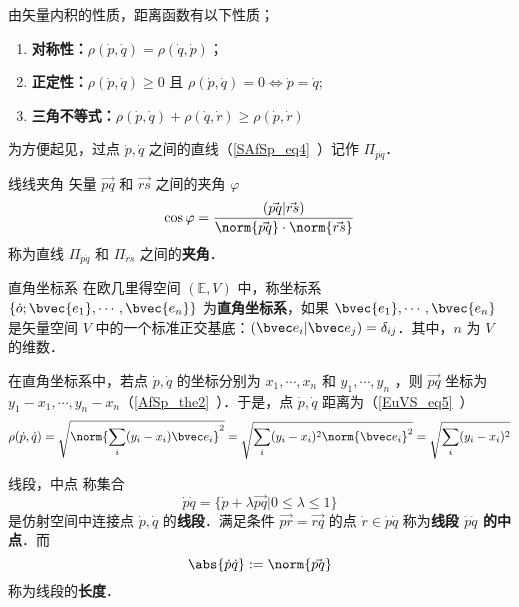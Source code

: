 由矢量内积的性质，距离函数有以下性质；
\begin{enumerate}
\item \textbf{对称性：}$\rho(\dot p,\dot q)=\rho(\dot q,\dot p)$；
\item \textbf{正定性：}$\rho(\dot p,\dot q)\geq 0$ 且 $\rho(\dot p,\dot q)= 0\Leftrightarrow\dot p=\dot q$;
\item \textbf{三角不等式：}$\rho(\dot p,\dot q)+\rho(\dot q,\dot r)\geq\rho(\dot p,\dot r)$
\end{enumerate}
为方便起见，过点 $\dot p,\dot q$ 之间的直线（\autoref{SAfSp_eq4}~）记作 $\Pi_{\dot p\dot q}$．
\begin{definition}{线线夹角}
矢量 $\vec{pq}$ 和 $\vec{rs}$ 之间的夹角 $\varphi$
\begin{equation}
\cos\varphi=\frac{(\vec{pq}|\vec{rs})}{\norm{\vec{pq}}\cdot\norm{\vec{rs}}}
\end{equation}
称为直线 $\Pi_{\dot p\dot q}$ 和 $\Pi_{\dot r\dot s}$ 之间的\textbf{夹角}．
\end{definition}
\begin{definition}{直角坐标系}
在欧几里得空间 $(\mathbb E,V)$ 中，称坐标系 $\{\dot o;\bvec{e_1},\cdots,\bvec{e_n}\}$ 为\textbf{直角坐标系}，如果 $\bvec{e_1},\cdots,\bvec{e_n}$ 是矢量空间 $V$ 中的一个标准正交基底：$(\bvec e_i|\bvec e_j)=\delta_{ij}$．其中，$n$ 为 $V$ 的维数．
\end{definition}
\begin{example}{}
在直角坐标系中，若点 $\dot p,\dot q$ 的坐标分别为 $x_1,\cdots,x_n$ 和 $y_1,\cdots,y_n$ ，则 $\vec{pq}$ 坐标为 $y_1-x_1,\cdots,y_n-x_n$（\autoref{AfSp_the2}~）．于是，点 $\dot p,\dot q$ 距离为（\autoref{EuVS_eq5}~）
\begin{equation}
\rho(\dot p,\dot q)=\sqrt{\norm{\sum_{i}(y_i-x_i)\bvec e_i}^2}=\sqrt{\sum_{i}(y_i-x_i)^2\norm{\bvec e_i}^2}=\sqrt{\sum_{i}(y_i-x_i)^2}
\end{equation}
\end{example}
\begin{definition}{线段，中点}
称集合
\begin{equation}
\dot p\dot q=\{\dot p+\lambda\vec{pq}|0\leq\lambda\leq1\}
\end{equation}
是仿射空间中连接点 $\dot p,\dot q$ 的\textbf{线段}．满足条件 $\vec{pr}=\vec{rq}$ 的点 $\dot r\in\dot p\dot q$ 称为\textbf{线段 $\dot p\dot q$ 的中点}．而
\begin{equation}
\abs{\dot p\dot q}:=\norm{\vec{pq}}
\end{equation}
称为线段的\textbf{长度}．
\end{definition}